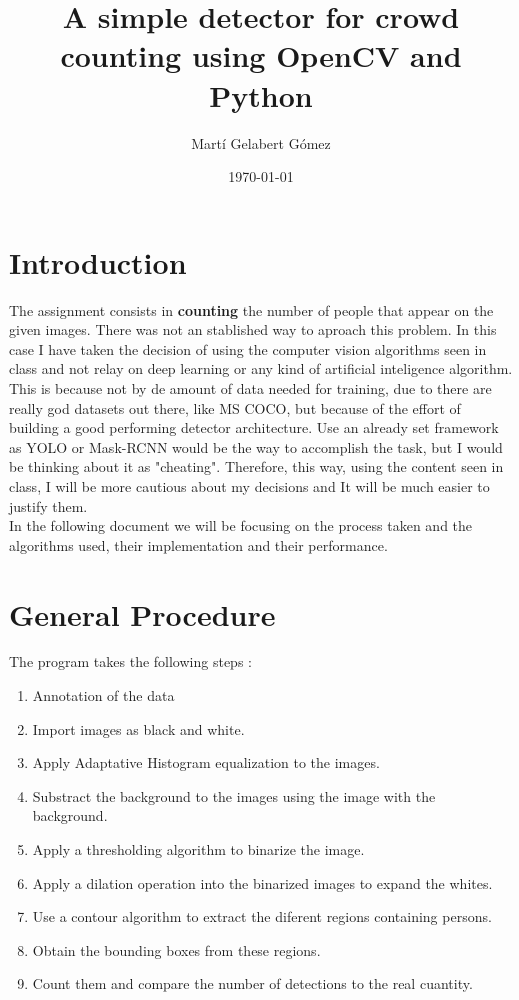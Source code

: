 \documentclass[10pt]{article}
\begin{document}
\title{A simple detector for crowd counting using OpenCV and Python}
\author{Martí Gelabert Gómez}
\date{\today}
\maketitle

\tableofcontents
\section{Introduction}
The assignment consists in \textbf{counting} the number of people that appear on the given images. There was not an stablished way to aproach this problem. In this case I have taken the decision of using the computer vision algorithms seen in class and not relay on deep learning or any kind of artificial inteligence algorithm. This is because not by de amount of data needed for training, due to there are really god datasets out there, like MS COCO, but because of the effort of building a good performing detector architecture. Use an already set framework as YOLO or Mask-RCNN would be the way to accomplish the task, but I would be thinking about it as "cheating". Therefore, this way, using the content seen in class, I will be more cautious about my decisions and It will be much easier to justify them.\\

In the following document  we will be focusing on the process taken and the algorithms used, their implementation and their performance.

\section{General Procedure}
The program takes the following steps :

\begin{enumerate}
  \item Annotation of the data
  \item Import images as black and white.
  \item Apply Adaptative Histogram equalization to the images.
  \item Substract the background to the images using the image with the background.
  \item Apply a thresholding algorithm to binarize the image.
  \item Apply a dilation operation into the binarized images to expand the whites.
  \item Use a contour algorithm to extract the diferent regions containing persons.
  \item Obtain the bounding boxes from these regions.
  \item Count them and compare the number of detections to the real cuantity.
\end{enumerate}
\end{document}
